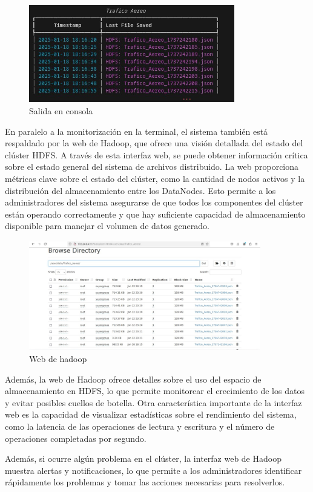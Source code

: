 \documentclass{article}
\begin{document}
\begin{figure}[h]
    \centering
    \includegraphics[width=0.8\textwidth]{terminal_output.jpg}
    \caption{Salida en consola}
\end{figure}

En paralelo a la monitorización en la terminal, el sistema también está respaldado por la web de Hadoop, que ofrece una visión detallada del estado del clúster HDFS. A través de esta interfaz web, se puede obtener información crítica sobre el estado general del sistema de archivos distribuido. La web proporciona métricas clave sobre el estado del clúster, como la cantidad de nodos activos y la distribución del almacenamiento entre los DataNodes. Esto permite a los administradores del sistema asegurarse de que todos los componentes del clúster están operando correctamente y que hay suficiente capacidad de almacenamiento disponible para manejar el volumen de datos generado.
\begin{figure}[h]
    \centering
    \includegraphics[width=0.9\textwidth]{HDFS_web.jpg}
    \caption{Web de hadoop}
\end{figure}

Además, la web de Hadoop ofrece detalles sobre el uso del espacio de almacenamiento en HDFS, lo que permite monitorear el crecimiento de los datos y evitar posibles cuellos de botella. Otra característica importante de la interfaz web es la capacidad de visualizar estadísticas sobre el rendimiento del sistema, como la latencia de las operaciones de lectura y escritura y el número de operaciones completadas por segundo.

Además, si ocurre algún problema en el clúster, la interfaz web de Hadoop muestra alertas y notificaciones, lo que permite a los administradores identificar rápidamente los problemas y tomar las acciones necesarias para resolverlos.
\end{document}
